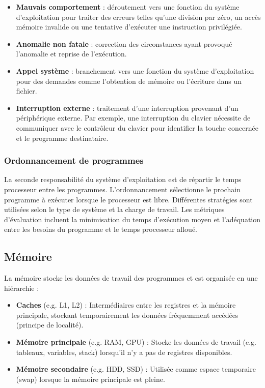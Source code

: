 \begin{itemize}
    \item \textbf{Mauvais comportement} : déroutement vers une fonction du système d'exploitation pour traiter des erreurs telles qu'une division par zéro, un accès mémoire invalide ou une tentative d'exécuter une instruction privilégiée.
    \item \textbf{Anomalie non fatale} : correction des circonstances ayant provoqué l'anomalie et reprise de l'exécution.
    \item \textbf{Appel système} : branchement vers une fonction du système d'exploitation pour des demandes comme l'obtention de mémoire ou l'écriture dans un fichier.
    \item \textbf{Interruption externe} : traitement d'une interruption provenant d'un périphérique externe. 
    Par exemple, une interruption du clavier nécessite de communiquer avec le contrôleur du clavier pour identifier la touche concernée et le programme destinataire.
\end{itemize}


\subsubsection{Ordonnancement de programmes}

La seconde responsabilité du système d'exploitation est de répartir le temps processeur entre les programmes. 
L'ordonnancement sélectionne le prochain programme à exécuter lorsque le processeur est libre. 
Différentes stratégies sont utilisées selon le type de système et la charge de travail. 
Les métriques d'évaluation incluent la minimisation du temps d'exécution moyen et l'adéquation entre les besoins du programme et le temps processeur alloué.


\subsection{Mémoire}

La mémoire stocke les données de travail des programmes et est organisée en une hiérarchie :
\begin{itemize}
    \item \textbf{Caches} (e.g. L1, L2) : Intermédiaires entre les registres et la mémoire principale, stockant temporairement les données fréquemment accédées (principe de localité).
    \item \textbf{Mémoire principale} (e.g. RAM, GPU) : Stocke les données de travail (e.g. tableaux, variables, stack) lorsqu'il n'y a pas de registres disponibles.
    \item \textbf{Mémoire secondaire} (e.g. HDD, SSD) : Utilisée comme espace temporaire (swap) lorsque la mémoire principale est pleine.
\end{itemize}

